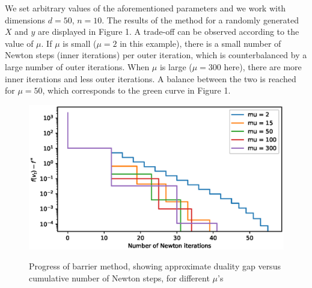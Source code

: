 \documentclass[a4paper,11pt]{article}
\begin{document}
We set arbitrary values of the aforementioned parameters and we work with dimensions $d=50$, $n=10$. The results of the method for a randomly generated $X$ and $y$ are displayed in Figure 1. A trade-off can be observed according to the value of $\mu$. If $\mu$ is small ($\mu=2$ in this example), there is a small number of Newton steps (inner iterations) per outer iteration, which is counterbalanced by a large number of outer iterations. When $\mu$ is large ($\mu=300$ here), there are more inner iterations and less outer iterations. \newline
A balance between the two is reached for $\mu=50$, which corresponds to the green curve in Figure 1. 
\begin{figure}[H]
\centering
 \includegraphics[scale=0.7]{plot.eps}  \\
\caption{Progress of barrier method, showing approximate duality gap versus cumulative number of Newton steps, for different $\mu$'s}
\end{figure}
\end{document}
